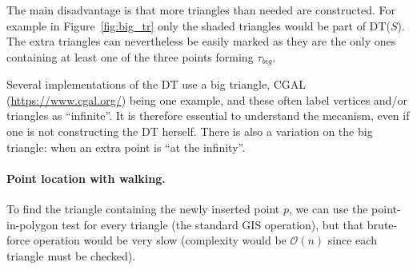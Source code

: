 %

The main disadvantage is that more triangles than needed are constructed. 
For example in Figure~\ref{fig:big_tr} only the shaded triangles would be part of DT($S$). 
The extra triangles can nevertheless be easily marked as they are the only ones containing at least one of the three points forming $\tau_{big}$. 

\begin{kaobox}[frametitle=\faCog\ How does it work in practice?]
Several implementations of the DT use a big triangle,  CGAL (\url{https://www.cgal.org/}) being one example, and these often label vertices and/or triangles as ``infinite''.
It is therefore essential to understand the mecanism, even if one is not constructing the DT herself.
There is also a variation on the big triangle: when an extra point is ``at the infinity''.
\end{kaobox}


\paragraph{Point location with walking.}%
\label{sec:dtwalk}

To find the triangle containing the newly inserted point $p$, we can use the point-in-polygon test for every triangle (the standard GIS operation), but that brute-force operation would be very slow (complexity would be $\mathcal{O}(n)$ since each triangle must be checked).

